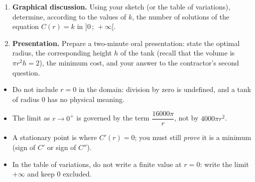 \documentclass[11pt]{article}
\newcounter{popsec}
\newcounter{popsub}
\newcommand{\courssub}[1]{%
  \stepcounter{popsub}%
  \par\vspace{9pt}\noindent{\popxbold\fontsize{11.5}{13}\selectfont\color{popink}{\color{poporange}\thepopsec.\thepopsub}\hspace{6pt}#1}\par\nopagebreak\vspace{4pt}
}
\begin{document}
\begin{exercice}
\begin{enumerate}
\item \textbf{Graphical discussion.} Using your sketch (or the table of variations), determine, according to the values of $k$, the number of solutions of the equation $C(r) = k$ in $]0\,;\,+\infty[$.

\item \textbf{Presentation.} Prepare a two-minute oral presentation: state the optimal radius, the corresponding height $h$ of the tank (recall that the volume is $\pi r^{2}h = 2$), the minimum cost, and your answer to the contractor's second question.
\end{enumerate}
\end{exercice}

\begin{attention}
\begin{itemize}
\item Do not include $r = 0$ in the domain: division by zero is undefined, and a tank of radius $0$ has no physical meaning.
\item The limit as $r \to 0^{+}$ is governed by the term $\dfrac{16000\pi}{r}$, not by $4000\pi r^{2}$.
\item A stationary point is where $C'(r) = 0$; you must still \emph{prove} it is a minimum (sign of $C'$ or sign of $C''$).
\item In the table of variations, do not write a finite value at $r = 0$: write the limit $+\infty$ and keep $0$ excluded.
\end{itemize}
\end{attention}

\courssub{Model answer}
\end{document}
